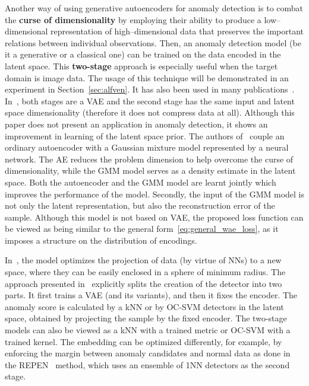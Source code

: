 Another way of using generative autoencoders for anomaly detection is to combat the \textbf{curse of dimensionality} by employing their ability to produce a low--dimensional representation of high--dimensional data that preserves the important relations between individual observations. Then, an anomaly detection model (be it a generative or a classical one) can be trained on the data encoded in the latent space. This \textbf{two-stage} approach is especially useful when the target domain is image data. The usage of this technique will be demonstrated in an experiment in Section~\ref{sec:alfven}. It has also been used in many publications~\cite{ergen2017unsupervised, yaoUnsupervisedAnomalyDetection2019, ruff2018deep, vskvara2020detection}. In~\cite{dai2019diagnosing}, both stages are a VAE and the second stage has the same input and latent space dimensionality (therefore it does not compress data at all). Although this paper does not present an application in anomaly detection, it shows an improvement in learning of the latent space prior. The authors of~\cite{zong2018deep} couple an ordinary autoencoder with a Gaussian mixture model represented by a neural network. The AE reduces the problem dimension to help overcome the curse of dimensionality, while the GMM model serves as a density estimate in the latent space. Both the autoencoder and the GMM model are learnt jointly which improves the performance of the model. Secondly, the input of the GMM model is not only the latent representation, but also the reconstruction error of the sample. Although this model is not based on VAE, the proposed loss function can be viewed as being similar to the general form~\eqref{eq:general_wae_loss}, as it imposes a structure on the distribution of encodings. 

In~\cite{ruff2018deep}, the model optimizes the projection of data (by virtue of NNs) to a new space, where they can be easily enclosed in a sphere of minimum radius. The approach presented in~\cite{vskvara2020detection, yaoUnsupervisedAnomalyDetection2019} explicitly splits the creation of the detector into two parts. It first trains a VAE (and its variants), and then it fixes the encoder. The anomaly score is calculated by a kNN \cite{vskvara2020detection} or by OC-SVM \cite{yaoUnsupervisedAnomalyDetection2019} detectors in the latent space, obtained by projecting the sample by the fixed encoder. The two-stage models can also be viewed as a kNN with a trained metric or OC-SVM with a trained kernel. The embedding can be optimized differently, for example, by enforcing the margin between anomaly candidates and normal data as done in the REPEN~\cite{pangLearningRepresentationsUltrahighdimensional2018} method, which uses an ensemble of 1NN detectors as the second stage.



